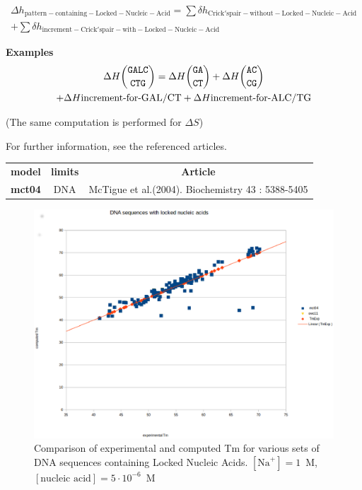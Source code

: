 \documentclass{article}
\begin{document}
\begin{multline*}
\Delta{}h_\mathrm{pattern-containing-Locked-Nucleic-Acid} =
\sum \delta{}h_\mathrm{Crick's pair-without-Locked-Nucleic-Acid} \\ +
\sum \delta{}h_\mathrm{increment-Crick's pair-with-Locked-Nucleic-Acid}
\end{multline*}

\textbf{Examples}
\begin{multline*}
\Delta H {\mbox{\texttt{GALC}} \choose \mbox{\texttt{CTG}}} = 
\Delta H {\mbox{\texttt{GA}} \choose \mbox{\texttt{CT}}} +
\Delta H {\mbox{\texttt{AC}} \choose \mbox{\texttt{CG}}} \\ +
\Delta H {\mbox{increment-for-GAL/CT}} +
\Delta H {\mbox{increment-for-ALC/TG}}\\
\end{multline*}

       (The same computation is performed for $\Delta S$) 
       
For further information, see the referenced articles.

\begin{table}[h]
\begin{tabular}[h]{| c | c | c}
\textbf{model} & \textbf{limits} & \textbf{Article} \\
\textbf{mct04} & DNA & McTigue et al.(2004). Biochemistry 43 : 5388-5405\\
\end{tabular}
\end{table}

\begin{figure}[h]
\includegraphics{images/LockedNucleicAcid.eps}
\caption{Comparison of experimental and computed Tm for various sets of
 DNA sequences containing Locked Nucleic Acids. $[\mbox{Na}^+] = 1$~M, $[\mbox{nucleic acid}] = 5\cdot{}10^{-6}$~M}
\end{figure}
      
\end{document}
